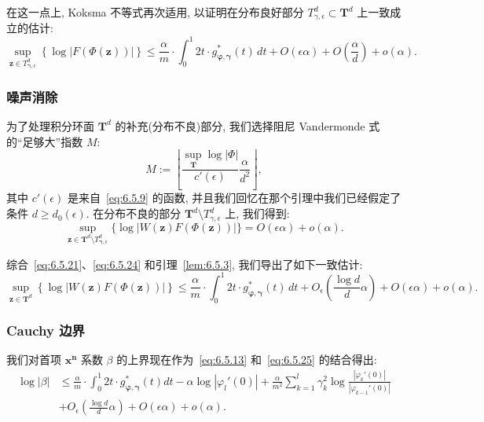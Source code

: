 在这一点上, Koksma 不等式再次适用, 以证明在分布良好部分 $T^d_{\gamma,\epsilon} \subset \mathbf{T}^d$ 上一致成立的估计:
\begin{equation}\label{eq:6.5.21}
\sup_{\mathbf{z} \in T_{\boldsymbol{\gamma},\epsilon}^d} \left\{ \log |F(\Phi(\mathbf{z}))| \right\} \le \frac{\alpha}{m} \cdot \int_0^1 2t \cdot g_{\boldsymbol{\varphi},\boldsymbol{\gamma}}^*(t) \, dt + O(\epsilon \alpha) + O\left(\frac{\alpha}{d}\right) + o(\alpha).
\end{equation}

\subsubsection{噪声消除}\label{sec:6.5.22}

为了处理积分环面 $\mathbf{T}^d$ 的补充(分布不良)部分, 我们选择阻尼 Vandermonde 式的``足够大''指数 $M$:
\begin{equation}\label{eq:6.5.23}
M := \left\lfloor \frac{\sup_{\mathbf{T}} \log |\Phi|}{c'(\epsilon)} \frac{\alpha}{d^2} \right\rfloor,
\end{equation}
其中 $c'(\epsilon)$ 是来自~\eqref{eq:6.5.9} 的函数, 并且我们回忆在那个引理中我们已经假定了条件 $d \geq d_0(\epsilon)$.
在分布不良的部分 $\mathbf{T}^d \setminus T_{\gamma,\epsilon}^d$ 上, 我们得到:
\begin{equation}\label{eq:6.5.24}
\sup_{\mathbf{z} \in \mathbf{T}^d \setminus T_{\boldsymbol{\gamma}, \epsilon}^d} \{ \log |W(\mathbf{z})F(\Phi(\mathbf{z}))| \} = O(\epsilon \alpha) + o(\alpha).
\end{equation}

综合~\eqref{eq:6.5.21}、\eqref{eq:6.5.24} 和引理~\ref{lem:6.5.3}, 我们导出了如下一致估计:
\begin{equation}\label{eq:6.5.25}
\sup_{\mathbf{z} \in \mathbf{T}^d} \left\{ \log |W(\mathbf{z})F(\Phi(\mathbf{z}))| \right\} \le \frac{\alpha}{m} \cdot \int_0^1 2t \cdot g_{\boldsymbol{\varphi},\boldsymbol{\gamma}}^*(t) \, dt + O_{\epsilon} \left( \frac{\log d}{d} \alpha \right) + O(\epsilon \alpha) + o(\alpha).
\end{equation}

\subsubsection{Cauchy 边界}\label{sec:6.5.26}

我们对首项 $\mathbf{x}^{\mathbf{n}}$ 系数 $\beta$ 的上界现在作为~\eqref{eq:6.5.13} 和~\eqref{eq:6.5.25} 的结合得出:
\begin{equation}\label{eq:6.5.27}
  \begin{aligned}
  \log |\beta| 
  & \leq \frac{\alpha}{m} \cdot \int_0^1 2t \cdot g_{\boldsymbol{\varphi}, \boldsymbol{\gamma}}^*(t) dt - \alpha \log |\varphi_l'(0)| + \frac{\alpha}{m^2} \sum_{k=1}^l \gamma_k^2 \log \frac{|\varphi_k'(0)|}{|\varphi_{k-1}'(0)|}  \\
  & + O_{\epsilon} \left(\frac{\log d}{d} \alpha\right) + O(\epsilon\alpha) + o(\alpha).
  \end{aligned}
\end{equation}



